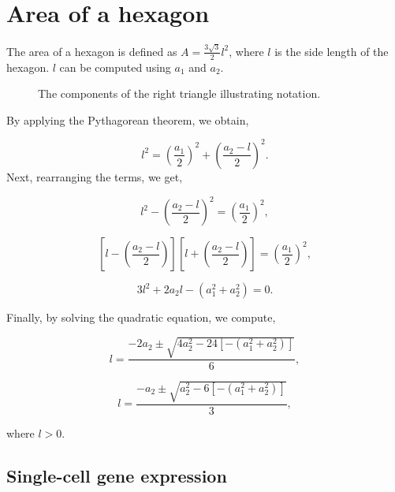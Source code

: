 \documentclass[
  12pt]{article}
\begin{document}
\section{Area of a hexagon}\label{area-of-a-hexagon}

The area of a hexagon is defined as \(A = \frac{3\sqrt{3}}{2}l^2\),
where \(l\) is the side length of the hexagon. \(l\) can be computed
using \(a_1\) and \(a_2\).

\begin{figure}


\caption{\label{fig-tri-param}The components of the right triangle
illustrating notation.}

\end{figure}%

By applying the Pythagorean theorem, we obtain,

\[
l^2 = \left(\frac{a_1}{2}\right)^2 + \left(\frac{a_2 - l}{2}\right)^2.
\] Next, rearranging the terms, we get,

\[
l^2 - \left(\frac{a_2 - l}{2}\right)^2 = \left(\frac{a_1}{2}\right)^2,
\]

\[
\left[l - \left(\frac{a_2 - l}{2}\right)\right]\left[l + \left(\frac{a_2 - l}{2}\right)\right] = \left(\frac{a_1}{2}\right)^2,
\]

\[
3l^2 + 2a_2l - (a_1^2 + a_2^2) = 0.
\]

Finally, by solving the quadratic equation, we compute,

\[
l = \frac{-2a_2 \pm \sqrt{4a_2^2 - 24[-(a_1^2 + a_2^2)]}}{6},
\]

\[
l = \frac{-a_2 \pm \sqrt{a_2^2 - 6[-(a_1^2 + a_2^2)]}}{3},
\]

where \(l > 0\).

\subsection{Single-cell gene
expression}\label{single-cell-gene-expression}
\end{document}
